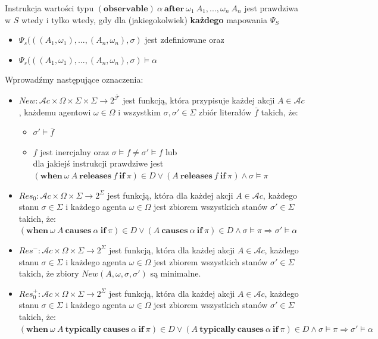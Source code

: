 \documentclass[11pt,a4paper]{article}
\begin{document}
    Instrukcja wartości typu $(\mathbf{observable})~\alpha~\mathbf{after}~\omega_1~A_1,...,\omega_n~A_n$ jest prawdziwa w $S$ wtedy i tylko wtedy, gdy dla (jakiegokolwiek) \textbf{każdego} mapowania $\Psi_S$
    \begin{itemize}
        \item $\Psi_s(((A_1, \omega_1), ..., (A_n, \omega_n), \sigma)$ jest zdefiniowane oraz 
        \item $\Psi_s(((A_1, \omega_1), ..., (A_n, \omega_n), \sigma) \models \alpha$
    \end{itemize}
    
    Wprowadźmy następujące oznaczenia:
    \begin{itemize}
        \item $New: \mathcal{A}c \times \Omega \times \Sigma \times \Sigma \rightarrow 2^{\bar{\mathcal{F}}}$ jest funkcją, która przypisuje każdej akcji $A \in \mathcal{A}c$, każdemu agentowi $\omega \in \Omega$ i wszystkim $\sigma, \sigma' \in \Sigma$ zbiór literałów $\bar{f}$ takich, że:
        \begin{itemize}
            \item $\sigma' \models \bar{f}$
            \item $f$ jest inercjalny oraz $\sigma \models f \neq \sigma' \models f$ lub\\
            dla jakiejś instrukcji prawdziwe jest $(\mathbf{when}~\omega~A~\mathbf{releases}~f~\mathbf{if}~\pi) \in D \vee (A~\mathbf{releases}~f~\mathbf{if}~\pi) \wedge \sigma \models \pi$
        \end{itemize}
        
        \item $Res_0: \mathcal{A}c \times \Omega \times \Sigma \rightarrow 2^\Sigma$ jest funkcją, która dla każdej akcji $A \in \mathcal{A}c$, każdego stanu $\sigma \in \Sigma$ i każdego agenta $\omega \in \Omega$ jest zbiorem wszystkich stanów $\sigma' \in \Sigma$ takich, że:\\
        $(\mathbf{when}~\omega~A~\mathbf{causes}~\alpha~\mathbf{if}~\pi) \in D \vee (A~\mathbf{causes}~\alpha~\mathbf{if}~\pi) \in D \wedge \sigma \models \pi \Rightarrow \sigma' \models \alpha$

        \item $Res^-: \mathcal{A}c \times \Omega \times \Sigma \rightarrow 2^\Sigma$ jest funkcją, która dla każdej akcji $A \in \mathcal{A}c$, każdego stanu $\sigma \in \Sigma$ i każdego agenta $\omega \in \Omega$ jest zbiorem wszystkich stanów $\sigma' \in \Sigma$ takich, że zbiory $New(A, \omega, \sigma, \sigma')$ są minimalne.
        
        \item $Res_0^+: \mathcal{A}c \times \Omega \times \Sigma \rightarrow 2^\Sigma$ jest funkcją, która dla każdej akcji $A \in \mathcal{A}c$, każdego stanu $\sigma \in \Sigma$ i każdego agenta $\omega \in \Omega$ jest zbiorem wszystkich stanów $\sigma' \in \Sigma$ takich, że:\\
        $(\mathbf{when}~\omega~A~\mathbf{typically~causes}~\alpha~\mathbf{if}~\pi) \in D \vee (A~\mathbf{typically~causes}~\alpha~\mathbf{if}~\pi) \in D \wedge \sigma \models \pi \Rightarrow \sigma' \models \alpha$
    \end{itemize}
    
\end{document}
